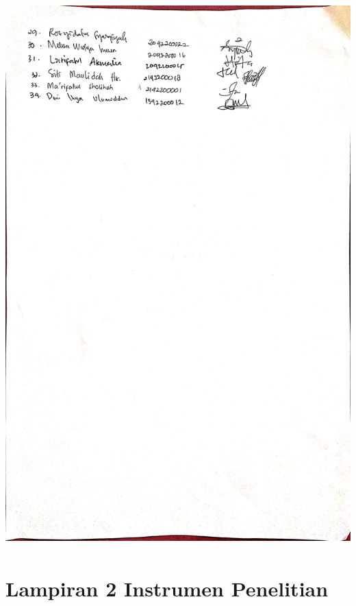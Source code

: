 \includegraphics[height=21cm]{daftar_hadir_2.jpg}

\newpage
\thispagestyle{empty}
\section*{Lampiran 2 Instrumen Penelitian}

